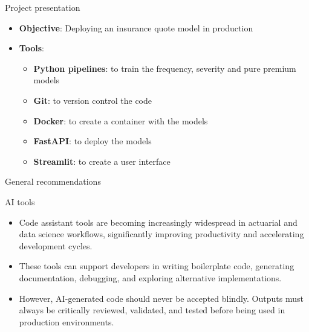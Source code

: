 \documentclass[
  ignorenonframetext,
]{beamer}
\providecommand{\tightlist}{%
  \setlength{\itemsep}{0pt}\setlength{\parskip}{0pt}}
\begin{document}
\begin{frame}
\begin{block}{Project presentation}
\label{project-presentation}
\begin{itemize}
\tightlist
\item
  \textbf{Objective}: Deploying an insurance quote model in production
\item
  \textbf{Tools}:

  \begin{itemize}
  \tightlist
  \item
    \textbf{Python pipelines}: to train the frequency, severity and pure
    premium models
  \item
    \textbf{Git}: to version control the code
  \item
    \textbf{Docker}: to create a container with the models
  \item
    \textbf{FastAPI}: to deploy the models
  \item
    \textbf{Streamlit}: to create a user interface
  \end{itemize}
\end{itemize}
\end{block}
\end{frame}

\begin{frame}{General recommendations}
\label{general-recommendations}
\begin{block}{AI tools}
\label{ai-tools}
\begin{itemize}
\tightlist
\item
  Code assistant tools are becoming increasingly widespread in actuarial
  and data science workflows, significantly improving productivity and
  accelerating development cycles.
\item
  These tools can support developers in writing boilerplate code,
  generating documentation, debugging, and exploring alternative
  implementations.
\item
  However, AI-generated code should never be accepted blindly. Outputs
  must always be critically reviewed, validated, and tested before being
  used in production environments.
\end{itemize}
\end{block}
\end{frame}
\end{document}

